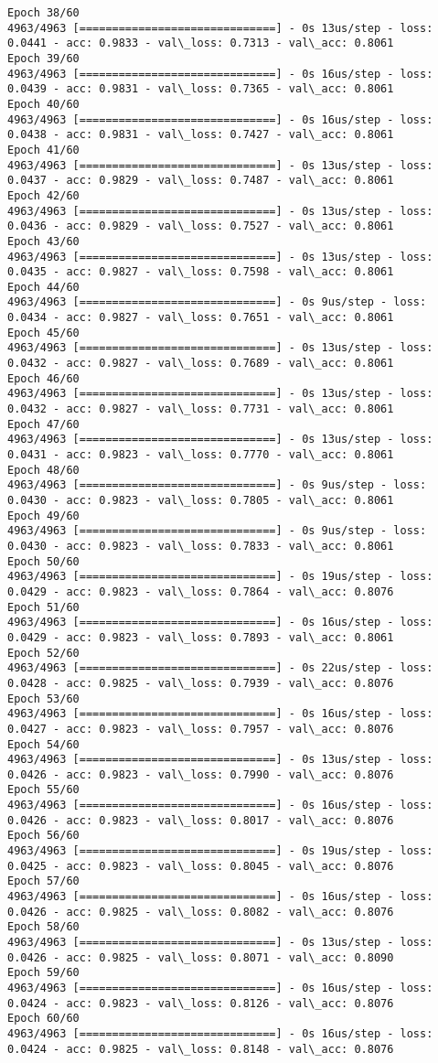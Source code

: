 \documentclass[11pt]{article}
\begin{document}
\begin{Verbatim}[commandchars=\\\{\}]
Epoch 38/60
4963/4963 [==============================] - 0s 13us/step - loss: 0.0441 - acc: 0.9833 - val\_loss: 0.7313 - val\_acc: 0.8061
Epoch 39/60
4963/4963 [==============================] - 0s 16us/step - loss: 0.0439 - acc: 0.9831 - val\_loss: 0.7365 - val\_acc: 0.8061
Epoch 40/60
4963/4963 [==============================] - 0s 16us/step - loss: 0.0438 - acc: 0.9831 - val\_loss: 0.7427 - val\_acc: 0.8061
Epoch 41/60
4963/4963 [==============================] - 0s 13us/step - loss: 0.0437 - acc: 0.9829 - val\_loss: 0.7487 - val\_acc: 0.8061
Epoch 42/60
4963/4963 [==============================] - 0s 13us/step - loss: 0.0436 - acc: 0.9829 - val\_loss: 0.7527 - val\_acc: 0.8061
Epoch 43/60
4963/4963 [==============================] - 0s 13us/step - loss: 0.0435 - acc: 0.9827 - val\_loss: 0.7598 - val\_acc: 0.8061
Epoch 44/60
4963/4963 [==============================] - 0s 9us/step - loss: 0.0434 - acc: 0.9827 - val\_loss: 0.7651 - val\_acc: 0.8061
Epoch 45/60
4963/4963 [==============================] - 0s 13us/step - loss: 0.0432 - acc: 0.9827 - val\_loss: 0.7689 - val\_acc: 0.8061
Epoch 46/60
4963/4963 [==============================] - 0s 13us/step - loss: 0.0432 - acc: 0.9827 - val\_loss: 0.7731 - val\_acc: 0.8061
Epoch 47/60
4963/4963 [==============================] - 0s 13us/step - loss: 0.0431 - acc: 0.9823 - val\_loss: 0.7770 - val\_acc: 0.8061
Epoch 48/60
4963/4963 [==============================] - 0s 9us/step - loss: 0.0430 - acc: 0.9823 - val\_loss: 0.7805 - val\_acc: 0.8061
Epoch 49/60
4963/4963 [==============================] - 0s 9us/step - loss: 0.0430 - acc: 0.9823 - val\_loss: 0.7833 - val\_acc: 0.8061
Epoch 50/60
4963/4963 [==============================] - 0s 19us/step - loss: 0.0429 - acc: 0.9823 - val\_loss: 0.7864 - val\_acc: 0.8076
Epoch 51/60
4963/4963 [==============================] - 0s 16us/step - loss: 0.0429 - acc: 0.9823 - val\_loss: 0.7893 - val\_acc: 0.8061
Epoch 52/60
4963/4963 [==============================] - 0s 22us/step - loss: 0.0428 - acc: 0.9825 - val\_loss: 0.7939 - val\_acc: 0.8076
Epoch 53/60
4963/4963 [==============================] - 0s 16us/step - loss: 0.0427 - acc: 0.9823 - val\_loss: 0.7957 - val\_acc: 0.8076
Epoch 54/60
4963/4963 [==============================] - 0s 13us/step - loss: 0.0426 - acc: 0.9823 - val\_loss: 0.7990 - val\_acc: 0.8076
Epoch 55/60
4963/4963 [==============================] - 0s 16us/step - loss: 0.0426 - acc: 0.9823 - val\_loss: 0.8017 - val\_acc: 0.8076
Epoch 56/60
4963/4963 [==============================] - 0s 19us/step - loss: 0.0425 - acc: 0.9823 - val\_loss: 0.8045 - val\_acc: 0.8076
Epoch 57/60
4963/4963 [==============================] - 0s 16us/step - loss: 0.0426 - acc: 0.9825 - val\_loss: 0.8082 - val\_acc: 0.8076
Epoch 58/60
4963/4963 [==============================] - 0s 13us/step - loss: 0.0426 - acc: 0.9825 - val\_loss: 0.8071 - val\_acc: 0.8090
Epoch 59/60
4963/4963 [==============================] - 0s 16us/step - loss: 0.0424 - acc: 0.9823 - val\_loss: 0.8126 - val\_acc: 0.8076
Epoch 60/60
4963/4963 [==============================] - 0s 16us/step - loss: 0.0424 - acc: 0.9825 - val\_loss: 0.8148 - val\_acc: 0.8076

    \end{Verbatim}
\end{document}
